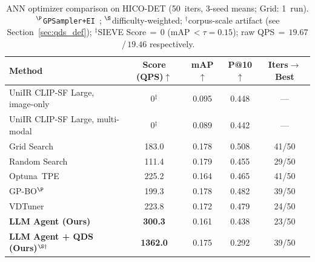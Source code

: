 \documentclass[sigconf, nonacm]{acmart}
\theoremstyle{definition}
\begin{document}
\begin{table}[t]
\centering
\caption{ANN optimizer comparison on HICO-DET (50~iters, 3-seed means; Grid: 1~run). $^\P$\texttt{GPSampler+EI}~\cite{snoek2012bayesian}; $^\S$difficulty-weighted; $^\dagger$corpus-scale artifact (see Section~\ref{sec:qds_def}); $^{\ddagger}$SIEVE Score\,$=\,0$ (mAP\,$<\tau{=}0.15$); raw QPS\,$=\,19.67$\,/\,$19.46$ respectively.}
\label{tab:optimizer}
\vspace{3pt}
\small
\setlength{\tabcolsep}{6pt}
\begin{tabular}{lcccc}
\toprule
\textbf{Method} & \textbf{Score (QPS)}$\uparrow$ & \textbf{mAP}$\uparrow$ & \textbf{P@10}$\uparrow$ & \textbf{Iters$\to$Best} \\
\midrule
UniIR CLIP-SF Large, image-only~\cite{wei2024uniir} & 0$^{\ddagger}$  & 0.095 & 0.448 & --- \\
UniIR CLIP-SF Large, multi-modal~\cite{wei2024uniir} & 0$^{\ddagger}$  & 0.089 & 0.442 & --- \\
Grid Search                               & 183.0          & 0.178 & 0.508 & 41/50 \\
Random Search~\cite{bergstra2012random}   & 111.4          & 0.179 & 0.455 & 29/50 \\
Optuna~TPE~\cite{akiba2019optuna}         & 225.2          & 0.164 & 0.465 & 41/50 \\
GP-BO$^\P$                                & 199.3          & 0.178 & 0.482 & 39/50 \\
VDTuner~\cite{yang2024vdtuner}            & 223.8          & 0.172 & 0.479 & 24/50 \\
\midrule
\textbf{LLM Agent (Ours)}                 & \textbf{300.3} & 0.161 & 0.438 & 23/50 \\
\textbf{LLM Agent + QDS (Ours)}$^{\S\dagger}$ & \textbf{1362.0}& 0.175 & 0.292 & 39/50 \\
\bottomrule
\end{tabular}
\end{table}
\end{document}
